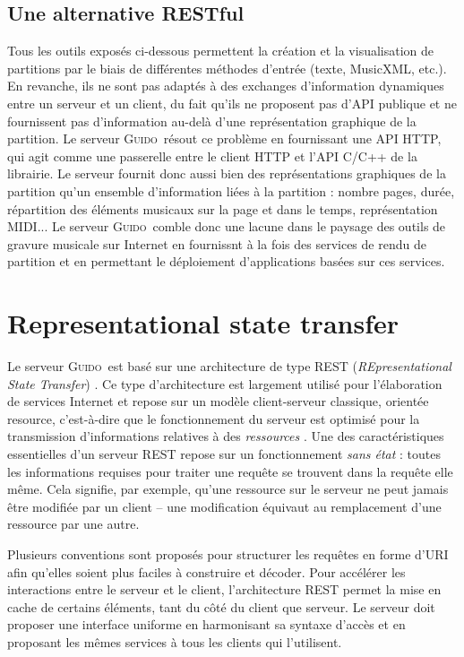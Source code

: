 \documentclass{article}
\newcommand{\guido}		{\textsc{Guido}}
\begin{document}
\subsection{Une alternative RESTful}\label{subsection:restful}
Tous les outils exposés ci-dessous permettent la création et la visualisation de partitions par le biais de différentes méthodes d'entrée (texte, MusicXML, etc.). En revanche, ils ne sont pas adaptés à des exchanges d'information dynamiques entre un serveur et un client, du fait qu'ils ne proposent pas d'API publique et ne fournissent pas d'information au-delà d'une représentation graphique de la partition. Le serveur \guido\ résout ce problème en fournissant une API HTTP, qui agit comme une passerelle entre le client HTTP et l'API C/C++ de la librairie. Le serveur fournit donc aussi bien des représentations graphiques de la partition qu'un ensemble d'information liées à la partition : nombre pages, durée, répartition des éléments musicaux sur la page et dans le temps, représentation MIDI...
Le serveur \guido\ comble donc une lacune dans le paysage des outils de gravure musicale sur Internet en fournissnt à la fois des services de rendu de partition et en permettant le déploiement d'applications basées sur ces services.

\section{Representational state transfer}\label{section:rest}

Le serveur \guido\ est basé sur une architecture de type REST (\emph{REpresentational State Transfer}) \cite{Fielding00}. Ce type d'architecture est largement utilisé pour l'élaboration de services Internet et repose sur un modèle client-serveur classique, \og{}orientée resource\fg{}, c'est-à-dire que le fonctionnement du serveur est optimisé pour la transmission d'informations relatives à des \emph{ressources} \cite{richardson2008restful}. Une des caractéristiques essentielles d'un serveur REST repose sur un fonctionnement \emph{sans état} : toutes les informations requises pour traiter une requête se trouvent dans la requête elle même. Cela signifie, par exemple, qu'une ressource sur le serveur ne peut jamais être modifiée par un client -- une modification équivaut au remplacement d'une ressource par une autre. 

Plusieurs conventions sont proposés pour structurer les requêtes en forme d'URI afin qu'elles soient plus faciles à construire et décoder. Pour accélérer les interactions entre le serveur et le client, l'architecture REST permet la mise en cache de certains éléments, tant du côté du client que serveur. Le serveur doit proposer une interface uniforme en harmonisant sa syntaxe d'accès et en proposant les mêmes services à tous les clients qui l'utilisent.
\end{document}
